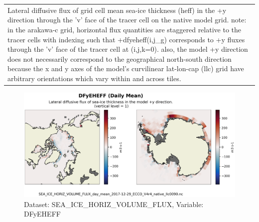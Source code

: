 \begin{longtable}{|m{}|m{}|m{}|m{}|}
\rowcolor{lightgray} \multicolumn{4}{|c|}{\textbf{Comments}} \\ \hline
\multicolumn{4}{|p{1\textwidth}|}{\footnotesize{{Lateral diffusive flux of grid cell mean sea-ice thickness (heff) in the +y direction through the 'v' face of the tracer cell on the native model grid. note: in the arakawa-c grid, horizontal flux quantities are staggered relative to the tracer cells with indexing such that +dfyeheff(i,j\_g) corresponds to +y fluxes through the 'v' face of the tracer cell at (i,j,k=0). also, the model +y direction does not necessarily correspond to the geographical north-south direction because the x and y axes of the model's curvilinear lat-lon-cap (llc) grid have arbitrary orientations which vary within and across tiles.}}} \\ \hline
\end{longtable}

\begin{figure}[H]
\centering
\includegraphics[scale=0.55]{../images/plots/v4r4/native_plots/Sea-Ice_and_Snow_Horizontal_Volume_Fluxes/DFyEHEFF.png}
\caption{Dataset: SEA\_ICE\_HORIZ\_VOLUME\_FLUX, Variable: DFyEHEFF}
\label{tab:table-SEA_ICE_HORIZ_VOLUME_FLUX_DFyEHEFF-Plot}
\end{figure}
\newpage
\pagebreak
